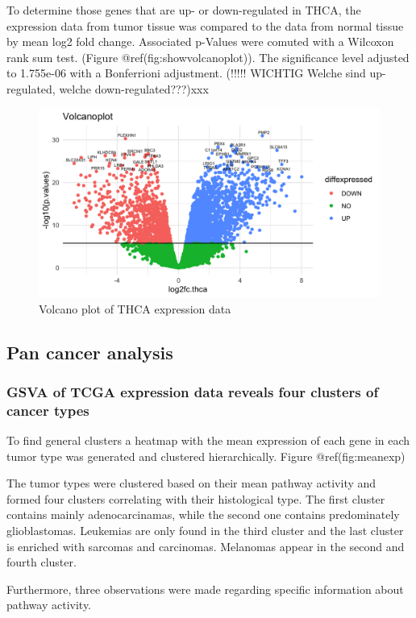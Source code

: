 \documentclass[
]{article}
\begin{document}
To determine those genes that are up- or down-regulated in THCA, the
expression data from tumor tissue was compared to the data from normal
tissue by mean log2 fold change. Associated p-Values were comuted with a
Wilcoxon rank sum test. (Figure @ref(fig:showvolcanoplot)). The
significance level adjusted to 1.755e-06 with a Bonferrioni adjustment.
(!!!!! WICHTIG Welche sind up-regulated, welche down-regulated???)xxx

\begin{figure}

{\centering \includegraphics[width=0.3\linewidth]{figures/Volcanoplot} 

}

\caption{Volcano plot of THCA expression data}\label{fig:showvolcanoplot}
\end{figure}

\hypertarget{pan-cancer-analysis}{%
\subsection{Pan cancer analysis}\label{pan-cancer-analysis}}

\hypertarget{gsva-of-tcga-expression-data-reveals-four-clusters-of-cancer-types}{%
\subsubsection{GSVA of TCGA expression data reveals four clusters of
cancer
types}\label{gsva-of-tcga-expression-data-reveals-four-clusters-of-cancer-types}}

To find general clusters a heatmap with the mean expression of each gene
in each tumor type was generated and clustered hierarchically. Figure
@ref(fig:meanexp)

The tumor types were clustered based on their mean pathway activity and
formed four clusters correlating with their histological type. The first
cluster contains mainly adenocarcinamas, while the second one contains
predominately glioblastomas. Leukemias are only found in the third
cluster and the last cluster is enriched with sarcomas and carcinomas.
Melanomas appear in the second and fourth cluster.

Furthermore, three observations were made regarding specific information
about pathway activity.
\end{document}
